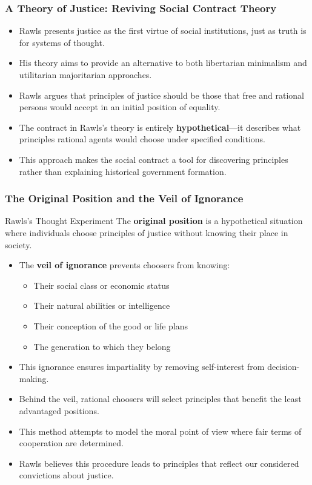 \documentclass[aspectratio=169]{beamer}
\begin{document}
\begin{frame}
  \frametitle{A Theory of Justice: Reviving Social Contract Theory}
  
  \begin{itemize}
    \item Rawls presents justice as the first virtue of social institutions, just as truth is for systems of thought.
    \item His theory aims to provide an alternative to both libertarian minimalism and utilitarian majoritarian approaches.
    \item Rawls argues that principles of justice should be those that free and rational persons would accept in an initial position of equality.
    \item The contract in Rawls's theory is entirely \textbf{hypothetical}—it describes what principles rational agents would choose under specified conditions.
    \item This approach makes the social contract a tool for discovering principles rather than explaining historical government formation.
  \end{itemize}
\end{frame}

\begin{frame}
  \frametitle{The Original Position and the Veil of Ignorance}
  
  \begin{alertblock}{Rawls's Thought Experiment}
    The \textbf{original position} is a hypothetical situation where individuals choose principles of justice without knowing their place in society.
  \end{alertblock}
  
  \begin{itemize}
    \item The \textbf{veil of ignorance} prevents choosers from knowing:
      \begin{itemize}
        \item Their social class or economic status
        \item Their natural abilities or intelligence
        \item Their conception of the good or life plans
        \item The generation to which they belong
      \end{itemize}
    \item This ignorance ensures impartiality by removing self-interest from decision-making.
    \item Behind the veil, rational choosers will select principles that benefit the least advantaged positions.
    \item This method attempts to model the moral point of view where fair terms of cooperation are determined.
    \item Rawls believes this procedure leads to principles that reflect our considered convictions about justice.
  \end{itemize}
\end{frame}
\end{document}
